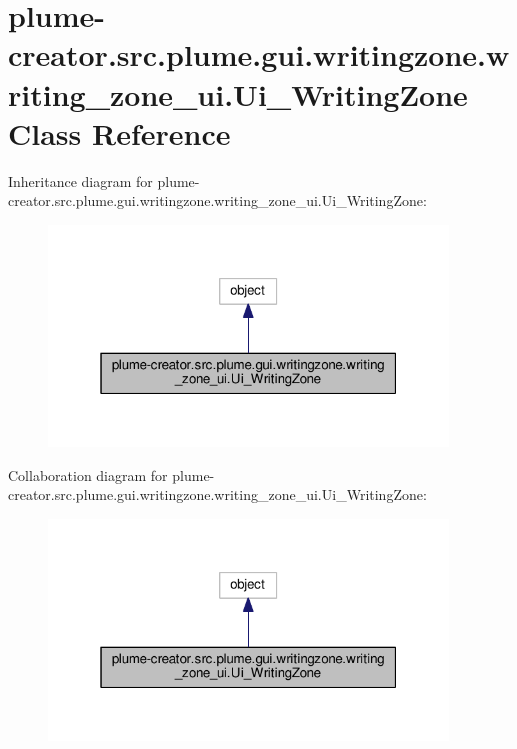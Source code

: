 \hypertarget{classplume-creator_1_1src_1_1plume_1_1gui_1_1writingzone_1_1writing__zone__ui_1_1_ui___writing_zone}{}\section{plume-\/creator.src.\+plume.\+gui.\+writingzone.\+writing\+\_\+zone\+\_\+ui.\+Ui\+\_\+\+Writing\+Zone Class Reference}
\label{classplume-creator_1_1src_1_1plume_1_1gui_1_1writingzone_1_1writing__zone__ui_1_1_ui___writing_zone}


Inheritance diagram for plume-\/creator.src.\+plume.\+gui.\+writingzone.\+writing\+\_\+zone\+\_\+ui.\+Ui\+\_\+\+Writing\+Zone\+:\nopagebreak
\begin{figure}[H]
\begin{center}
\leavevmode
\includegraphics[width=301pt]{classplume-creator_1_1src_1_1plume_1_1gui_1_1writingzone_1_1writing__zone__ui_1_1_ui___writing_zone__inherit__graph}
\end{center}
\end{figure}


Collaboration diagram for plume-\/creator.src.\+plume.\+gui.\+writingzone.\+writing\+\_\+zone\+\_\+ui.\+Ui\+\_\+\+Writing\+Zone\+:\nopagebreak
\begin{figure}[H]
\begin{center}
\leavevmode
\includegraphics[width=301pt]{classplume-creator_1_1src_1_1plume_1_1gui_1_1writingzone_1_1writing__zone__ui_1_1_ui___writing_zone__coll__graph}
\end{center}
\end{figure}
